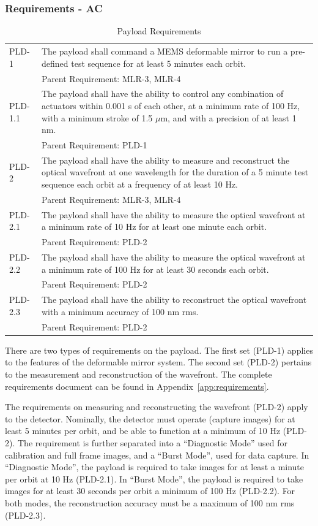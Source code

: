 \documentclass[12pt]{article}
\begin{document}
\subsubsection{Requirements - AC}\label{sec:payload_requirements}

\begin{table}[ht]
\caption{Payload Requirements}
\begin{tabular}{l p{5in}} 
PLD-1 & The payload shall command a MEMS deformable mirror to run a pre-defined test sequence for at least 5 minutes each orbit. \\
& Parent Requirement: MLR-3, MLR-4\\
PLD-1.1 & The payload shall have the ability to control any combination of actuators within 0.001 s of each other, at a minimum rate of 100 Hz, with a minimum stroke of 1.5  $\mu$m, and with a precision of at least 1 nm.\\
& Parent Requirement: PLD-1\\
PLD-2 & The payload shall have the ability to measure and reconstruct the optical wavefront at one wavelength for the duration of a 5 minute test sequence each orbit at a frequency of at least 10 Hz.\\
& Parent Requirement: MLR-3, MLR-4\\
PLD-2.1 & The payload shall have the ability to measure the optical wavefront at a minimum rate of 10 Hz for at least one minute each orbit.\\
& Parent Requirement: PLD-2\\
PLD-2.2 & The payload shall have the ability to measure the optical wavefront at a minimum rate of 100 Hz for at least 30 seconds each orbit.\\
& Parent Requirement: PLD-2\\
PLD-2.3 & The payload shall have the ability to reconstruct the optical wavefront with a minimum accuracy of 100 nm rms.\\
& Parent Requirement: PLD-2\\
\end{tabular}\label{table:payload_requirements}
\end{table}

There are two types of requirements on the payload.  The first set (PLD-1) applies to the features of the deformable mirror system.  The second set (PLD-2) pertains to the measurement and reconstruction of the wavefront.  The complete requirements document can be found in Appendix~\ref{app:requirements}. 

The requirements on measuring and reconstructing the wavefront (PLD-2) apply to the detector.  Nominally, the detector must operate (capture images) for at least 5 minutes per orbit, and be able to function at a minimum of 10 Hz (PLD-2). The requirement is further separated into a ``Diagnostic Mode'' used for calibration and full frame images, and a ``Burst Mode'', used for data capture.  In ``Diagnostic Mode'', the payload is required to take images for at least a minute per orbit at 10 Hz (PLD-2.1).  In ``Burst Mode'', the payload is required to take images for at least 30 seconds per orbit a minimum of 100 Hz (PLD-2.2).  For both modes, the reconstruction accuracy must be a maximum of 100 nm rms (PLD-2.3).
			
\end{document}
